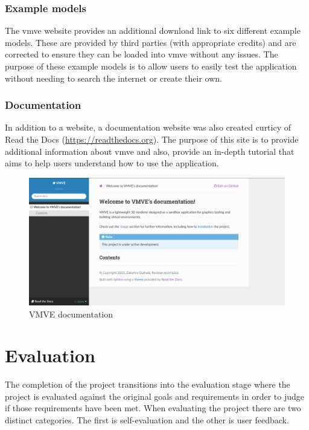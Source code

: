 \documentclass[11pt]{article}
\begin{document}
\subsubsection{Example models}
The \gls*{vmve} website provides an additional download link to six different
example models. These are provided by third parties (with appropriate credits)
and are corrected to ensure they can be loaded into \gls*{vmve} without any
issues. The purpose of these example models is to allow users to easily test the
application without needing to search the internet or create their own.

\subsubsection{Documentation}
In addition to a website, a documentation website was also created curticy of
Read the Docs (\href{https://readthedocs.org}{https://readthedocs.org}). The
purpose of this site is to provide additional information about \gls*{vmve} and
also, provide an in-depth tutorial that aims to help users understand how to use
the application.

\begin{figure}[H]
  \centering
  \includegraphics[width=\textwidth]{images/documentation.png}
  \caption{VMVE documentation}
  \label{fig:documentation}
\end{figure}


\clearpage
\section{Evaluation}
The completion of the project transitions into the evaluation stage where the
project is evaluated against the original goals and requirements in order to
judge if those requirements have been met. When evaluating the project there are
two distinct categories. The first is self-evaluation and the other is user
feedback.
\end{document}
